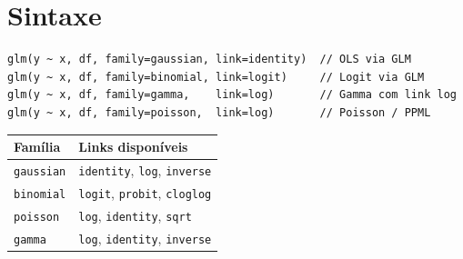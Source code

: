 \section{Sintaxe}

\begin{lstlisting}
glm(y ~ x, df, family=gaussian, link=identity)  // OLS via GLM
glm(y ~ x, df, family=binomial, link=logit)     // Logit via GLM
glm(y ~ x, df, family=gamma,    link=log)       // Gamma com link log
glm(y ~ x, df, family=poisson,  link=log)       // Poisson / PPML
\end{lstlisting}

\begin{center}
\begin{tabular}{ll}
\toprule
\textbf{Família} & \textbf{Links disponíveis} \\
\midrule
\texttt{gaussian}  & \texttt{identity}, \texttt{log}, \texttt{inverse} \\
\texttt{binomial}  & \texttt{logit}, \texttt{probit}, \texttt{cloglog} \\
\texttt{poisson}   & \texttt{log}, \texttt{identity}, \texttt{sqrt} \\
\texttt{gamma}     & \texttt{log}, \texttt{identity}, \texttt{inverse} \\
\bottomrule
\end{tabular}
\end{center}
